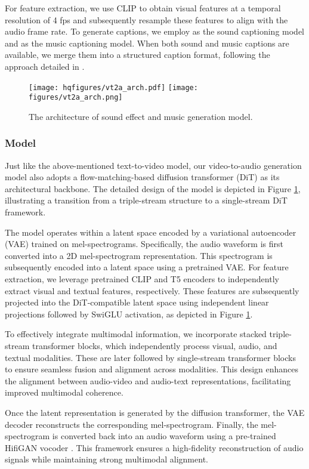 For feature extraction, we use CLIP \cite{clip} to obtain visual features at a temporal resolution of 4 fps and subsequently resample these features to align with the audio frame rate. To generate captions, we employ \cite{haji2024taming} as the sound captioning model and \cite{doh2023lp} as the music captioning model. When both sound and music captions are available, we merge them into a structured caption format, following the approach detailed in \cite{polyak2024movie}.


\begin{figure}[t]
    \centering
    \ifhq
    \texttt{[image: hqfigures/vt2a\_arch.pdf]}
    \else
    \texttt{[image: figures/vt2a\_arch.png]}
    \fi
    \caption{The architecture of sound effect and music generation model. }
    \label{fig:audio-gen}
\end{figure}

\subsubsection{Model}
Just like the above-mentioned text-to-video model, our video-to-audio generation model also adopts a flow-matching-based diffusion transformer (DiT) as its architectural backbone. The detailed design of the model is depicted in Figure \ref{fig:audio-gen}, illustrating a transition from a triple-stream structure to a single-stream DiT framework.

The model operates within a latent space encoded by a variational autoencoder (VAE) trained on mel-spectrograms. Specifically, the audio waveform is first converted into a 2D mel-spectrogram representation. This spectrogram is subsequently encoded into a latent space using a pretrained VAE. For feature extraction, we leverage pretrained CLIP \cite{clip} and T5 \cite{raffel2020exploring} encoders to independently extract visual and textual features, respectively. These features are subsequently projected into the DiT-compatible latent space using independent linear projections followed by SwiGLU activation, as depicted in Figure \ref{fig:audio-gen}.

To effectively integrate multimodal information, we incorporate stacked triple-stream transformer blocks, which independently process visual, audio, and textual modalities. These are later followed by single-stream transformer blocks to ensure seamless fusion and alignment across modalities. This design enhances the alignment between audio-video and audio-text representations, facilitating improved multimodal coherence.

Once the latent representation is generated by the diffusion transformer, the VAE decoder reconstructs the corresponding mel-spectrogram. Finally, the mel-spectrogram is converted back into an audio waveform using a pre-trained HifiGAN vocoder \cite{kong2020hifi}. This framework ensures a high-fidelity reconstruction of audio signals while maintaining strong multimodal alignment.
